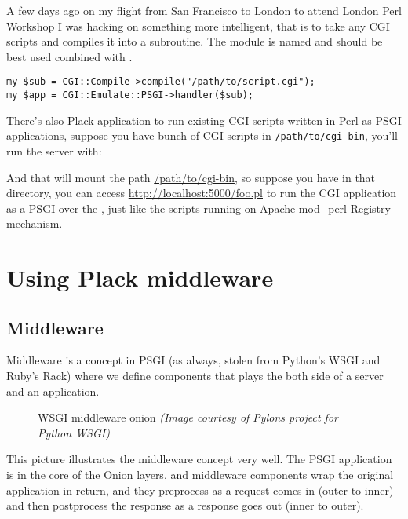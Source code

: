 A few days ago on my flight from San Francisco to London to attend
London Perl Workshop I was hacking on something more intelligent, that
is to take any CGI scripts and compiles it into a subroutine. The module
is named
\href{http://search.cpan.org/perldoc?CGI::Compile}{} and
should be best used combined with .

\begin{lstlisting}
my $sub = CGI::Compile->compile("/path/to/script.cgi");
my $app = CGI::Emulate::PSGI->handler($sub);
\end{lstlisting}

There's also
\href{http://search.cpan.org/perldoc?Plack::App::CGIBin}{}
Plack application to run existing CGI scripts written in Perl as PSGI
applications, suppose you have bunch of CGI scripts in
\lstinline!/path/to/cgi-bin!, you'll run the server with:


And that will mount the path \url{/path/to/cgi-bin}, so suppose
you have  in that directory, you can access
\url{http://localhost:5000/foo.pl} to run the CGI application as a PSGI over
the , just like the scripts running on Apache mod\_perl Registry
mechanism.

\chapter{Using Plack
middleware}\label{day-10-using-plack-middleware}

\section{Middleware}\label{middleware}

Middleware is a concept in PSGI (as always, stolen from Python's WSGI
and Ruby's Rack) where we define components that plays the both side of
a server and an application.

\begin{figure}[htbp]
\centering

\caption{WSGI middleware onion 
  \emph{(Image courtesy of Pylons project for Python WSGI)}}
\end{figure}

This picture illustrates the middleware concept very well. The PSGI
application is in the core of the Onion layers, and middleware
components wrap the original application in return, and they preprocess
as a request comes in (outer to inner) and then postprocess the response
as a response goes out (inner to outer).

